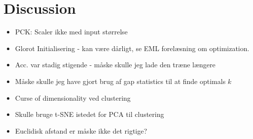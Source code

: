 \documentclass[./main.tex]{subfiles}
\begin{document}
\section{Discussion}
\begin{itemize}
    \item PCK: Scaler ikke med input størrelse
    \item Glorot Initialisering - kan være dårligt, se EML forelæsning om optimization.
    \item Acc. var stadig stigende - måske skulle jeg lade den træne længere
    \item Måske skulle jeg have gjort brug af gap statistics til at finde optimals $k$
    \item Curse of dimensionality ved clustering
    \item Skulle bruge t-SNE istedet for PCA til clustering
    \item Euclidisk afstand er måske ikke det rigtige?
\end{itemize}
\end{document}

